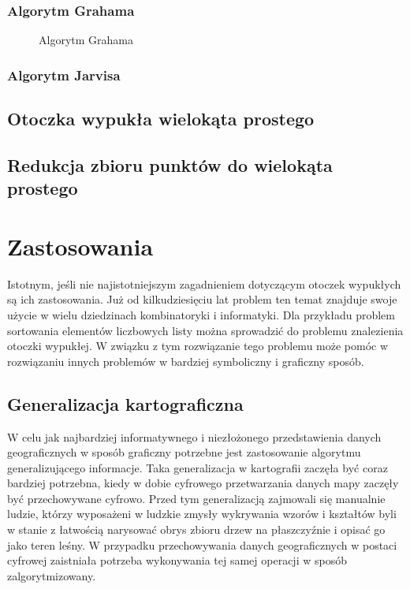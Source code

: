               
        \subsection{Algorytm Grahama}
        \null
        \begin{figure}[h!]
    			
    			\caption{Algorytm Grahama}\label{fig:graham}
    	\end{figure}
       \newpage
        \subsection{Algorytm Jarvisa}
        
        
        \section{Otoczka wypukła wielokąta prostego}
        \cite{convexhullsimplepolygon}
        \section{Redukcja zbioru punktów do wielokąta prostego}
    \chapter{Zastosowania} 
    Istotnym, jeśli nie najistotniejszym zagadnieniem dotyczącym otoczek wypukłych są ich zastosowania. Już od kilkudziesięciu lat problem ten temat znajduje swoje użycie w wielu dziedzinach kombinatoryki i informatyki. Dla przykładu problem sortowania elementów liczbowych listy można sprowadzić do problemu znalezienia otoczki wypukłej. W związku z tym rozwiązanie tego problemu może pomóc w rozwiązaniu innych problemów w bardziej symboliczny i graficzny sposób.
        \section{Generalizacja kartograficzna}
        W celu jak najbardziej informatywnego i niezłożonego przedstawienia danych geograficznych w sposób graficzny potrzebne jest zastosowanie algorytmu generalizującego informacje. Taka generalizacja w kartografii zaczęła być coraz bardziej potrzebna, kiedy w dobie cyfrowego przetwarzania danych mapy zaczęły być przechowywane cyfrowo. Przed tym generalizacją zajmowali się manualnie ludzie, którzy wyposażeni w ludzkie zmysły wykrywania wzorów i kształtów byli w stanie z łatwością narysować obrys zbioru drzew na płaszczyźnie i opisać go jako teren leśny. W przypadku przechowywania danych geograficznych w postaci cyfrowej zaistniała potrzeba wykonywania tej samej operacji w sposób zalgorytmizowany. \cite{cartography}
        
